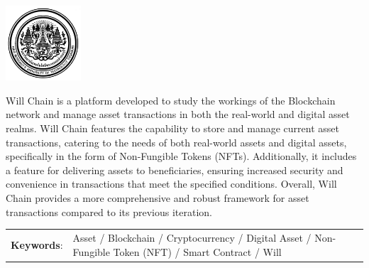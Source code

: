 \documentclass[12pt,oneside,openright,a4paper]{cpe-thai-project}
\begin{document}
\pdfstringdefDisableCommands{%
\let\MakeUppercase\relax
}

\begin{center}
  \includegraphics[width=2.8cm]{logo02.jpg}
\end{center}
\vspace*{-1cm}

\maketitlepage
\makesignaturepage 

\abstract


Will Chain is a platform developed to study the workings of the Blockchain network and manage asset transactions in both the real-world and digital asset realms. Will Chain features the capability to store and manage current asset transactions, catering to the needs of both real-world assets and digital assets, specifically in the form of Non-Fungible Tokens (NFTs). Additionally, it includes a feature for delivering assets to beneficiaries, ensuring increased security and convenience in transactions that meet the specified conditions. Overall, Will Chain provides a more comprehensive and robust framework for asset transactions compared to its previous iteration.

\begin{flushleft}
\begin{tabular*}{\textwidth}{@{}lp{}}
\textbf{Keywords}: & Asset / Blockchain / Cryptocurrency / Digital Asset / Non-Fungible Token (NFT) /  Smart Contract / Will 
\end{tabular*}
\end{flushleft}
\endabstract

\newcommand\tab[1][1cm]{\hspace*{#1}}
\thaiabstract
\end{document}
